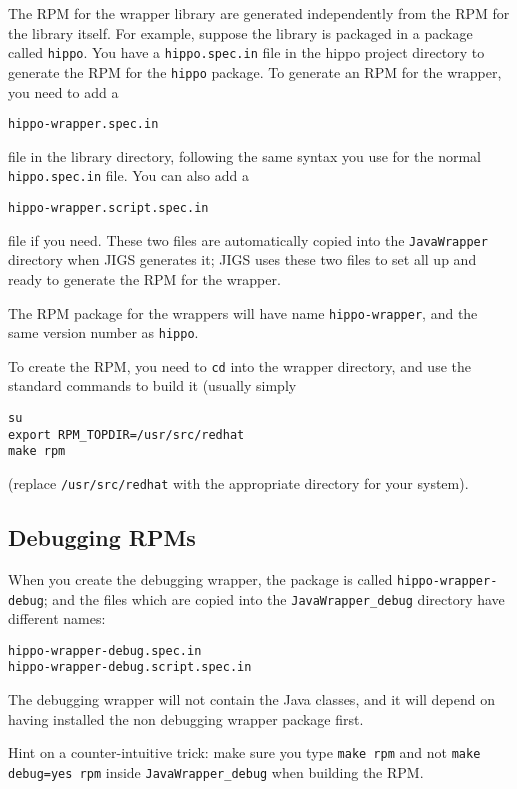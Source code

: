 The RPM for the wrapper library are generated independently from the
RPM for the library itself.  For example, suppose the library is
packaged in a package called \texttt{hippo}.  You have a
\texttt{hippo.spec.in} file in the hippo project directory to generate 
the RPM for the \texttt{hippo} package.  To generate an RPM for the 
wrapper, you need to add a 
\begin{verbatim} 
hippo-wrapper.spec.in
\end{verbatim}
file in the library directory, following the same syntax you use for the 
normal \texttt{hippo.spec.in} file.  You can also add a 
\begin{verbatim}
hippo-wrapper.script.spec.in
\end{verbatim}
file if you need.  These two files are automatically copied into the
\texttt{JavaWrapper} directory when JIGS generates it; JIGS uses these two 
files to set all up and ready to generate the RPM for the wrapper.

The RPM package for the wrappers will have name
\texttt{hippo-wrapper}, and the same version number as \texttt{hippo}.

To create the RPM, you need to \texttt{cd} into the wrapper directory,
and use the standard commands to build it (usually simply
\begin{verbatim}
su
export RPM_TOPDIR=/usr/src/redhat
make rpm
\end{verbatim}
(replace \texttt{/usr/src/redhat} with the appropriate directory for
your system).

\subsection{Debugging RPMs}

When you create the debugging wrapper, the package is called
\texttt{hippo-wrapper-debug}; and the files which are copied into the
\texttt{JavaWrapper\_debug} directory have different names:
\begin{verbatim}
hippo-wrapper-debug.spec.in
hippo-wrapper-debug.script.spec.in
\end{verbatim}

The debugging wrapper will not contain the Java classes, and it will
depend on having installed the non debugging wrapper package first.

Hint on a counter-intuitive trick: make sure you type \texttt{make
rpm} and not \texttt{make debug=yes rpm} inside
\texttt{JavaWrapper\_debug} when building the RPM.
